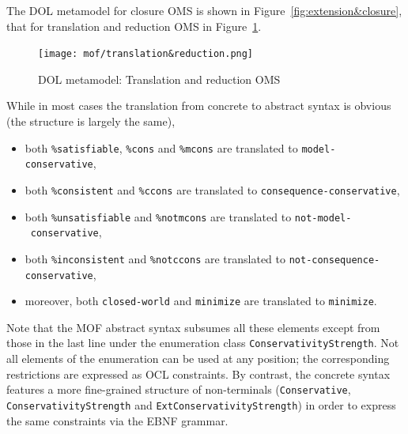 \documentclass[10pt, a4paper]{isov2}
\makeatletter
\newcommand*\CommentAuthor{}
\renewcommand*\CommentAuthor{#1}}
\newcommand*\CommentDate{}
\renewcommand*\CommentDate{#1}}
\newcommand*\CommentId{}
\renewcommand*\CommentId{#1}}
\newcommand*\CommentType{}
\renewcommand*\CommentType{#1}}
\newcommand*{\SetCommentColorByType}[1]{%
\edef\localType{{#1}}%
\expandafter\ifstrequal\localType{q-aut}{\colorlet{CommentColor}{red}}{%
\expandafter\ifstrequal\localType{q-all}{\colorlet{CommentColor}{orange}}{%
\expandafter\ifstrequal\localType{todo}{\colorlet{CommentColor}{orange}}{%
\expandafter\ifstrequal\localType{fyi}{\colorlet{CommentColor}{lightgray}}{%
\colorlet{CommentColor}{yellow}}}}}}
\newcommand*{\SetCommentPrefixByType}[1]{%
\edef\localType{{#1}}%
\expandafter\@ifmtarg\localType{%
\edef\CommentPrefix{}%
}{%
\caseupper[q]{#1}%
\edef\CommentPrefix{\thestring: }%
}}
\newcommand*{\initComment}[1]{%
\setkeys{Comment}{#1}%
\SetCommentColorByType{\CommentType}%
\relax%
\SetCommentPrefixByType{\CommentType}%
\relax%
}
\newcommand*{\todonote}[2][]{%
\initComment{#1}%
\pdfcomment[author=\CommentAuthor,color=CommentColor,date=\CommentDate,id=\CommentId]{%
\CommentPrefix
#2}}
\renewcommand*{\todonote}[2][]{%
\initComment{#1}%
\ednote{\CommentPrefix #2}}
\newcommand*{\CLnote}[2][author=Christoph Lange]{%
\todonote[author=Christoph Lange,#1]{#2}}
\newcommand*{\syntax}[1]{\texttt{#1}}
\makeatother
\begin{document}
The DOL metamodel for closure OMS is shown in
Figure~\ref{fig:extension&closure}, that for translation and reduction
OMS in Figure~\ref{fig:translations&reduction}.



\medskip
\begin{figure}
  \centering
    \texttt{[image: mof/translation\&reduction.png]}
  \caption{DOL metamodel: Translation and reduction OMS}
  \label{fig:translations&reduction}
\end{figure}



 \label{a:dol-text:OMS}


While in most cases the translation from concrete to abstract syntax
is obvious (the structure is largely the same),
\begin{itemize}[noitemsep]
\item both \syntax{\%satisfiable}, \syntax{\%cons} and \syntax{\%mcons} are translated
  to \syntax{model-con\-servative},
\item both \syntax{\%consistent}  and \syntax{\%ccons} are translated
  to \syntax{consequence-conser\-vative},
\item  both   \syntax{\%unsatisfiable} and \syntax{\%notmcons} are translated to
  \syntax{not-model-}\ \syntax{conservative},
\item both \syntax{\%inconsistent}  and \syntax{\%notccons} are translated
  to \syntax{not-consequen\-ce-conservative},
\item moreover, both \syntax{closed-world} and \syntax{minimize} are
  translated to \syntax{minimize}.
\end{itemize}
Note that the MOF abstract syntax subsumes all these elements except
from those in the last line under the enumeration class
\syntax{ConservativityStrength}. Not all elements of the enumeration
can be used at any position; the corresponding restrictions are
expressed as OCL constraints.  By contrast, the concrete syntax
features a more fine-grained structure of non-terminals
(\syntax{Conservative}, \syntax{ConservativityStrength} and
\syntax{ExtConservativityStrength}) in order to express the same
constraints via the EBNF grammar.
\end{document}
